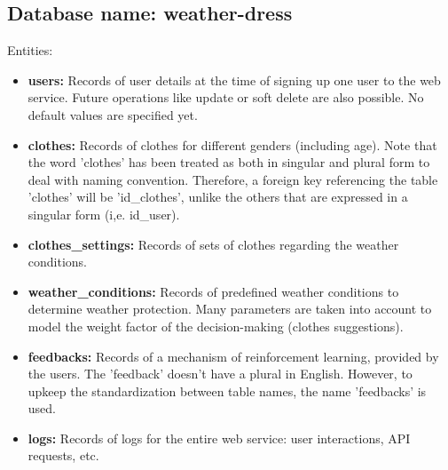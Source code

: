 \documentclass[]{article}
\begin{document}
\subsection{Database name: weather-dress}

Entities:
\begin{itemize}
	\item \textbf{users:} Records of user details at the time of signing up one user to the web service. Future operations like update or soft delete are also possible. No default values are specified yet.
	\item \textbf{clothes:} Records of clothes for different genders (including age). Note that the word 'clothes' has been treated as both in singular and plural form to deal with naming convention. Therefore, a foreign key referencing the table 'clothes' will be 'id\_clothes', unlike the others that are expressed in a singular form (i,e. id\_user).
	\item \textbf{clothes\_settings:} Records of sets of clothes regarding the weather conditions.
	\item \textbf{weather\_conditions:} Records of predefined weather conditions to determine weather protection. Many parameters are taken into account to model the weight factor of the decision-making (clothes suggestions).
	\item \textbf{feedbacks:} Records of a mechanism of reinforcement learning, provided by the users. The 'feedback' doesn't have a plural in English. However, to upkeep the standardization between table names, the name 'feedbacks' is used.
	\item \textbf{logs:} Records of logs for the entire web service: user interactions, API requests, etc.
\end{itemize}
\end{document}
